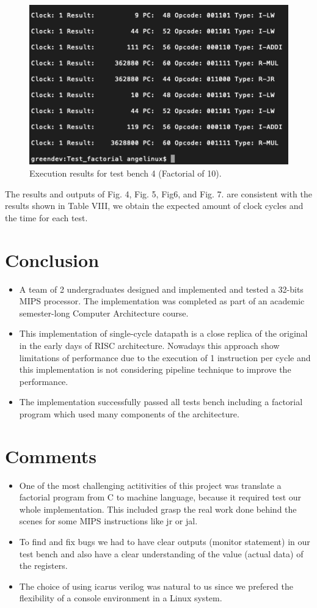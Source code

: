 \documentclass[conference]{IEEEtran}
\begin{document}
\begin{figure}[h]
\includegraphics[scale=0.5]{test_bench_4_factorial.png}
\caption{Execution results for test bench 4 (Factorial of 10).}
\label{result3}
\end{figure}

The results and outputs of Fig. 4, Fig. 5, Fig6, and Fig. 7. are consistent with the results shown in Table VIII, we obtain the expected amount of clock cycles and the time for each test.
 
\section{Conclusion}
\begin{itemize}
\item A team of 2 undergraduates designed and implemented and tested a 32-bits MIPS processor. The implementation was completed as part of an academic semester-long Computer Architecture course.
\item This implementation of single-cycle datapath is a close replica of the original in the early days of RISC architecture. Nowadays this approach show limitations of performance due to the execution of 1 instruction per cycle and this implementation is not considering pipeline technique to improve the performance.
\item The implementation successfully passed all tests bench including a factorial program which used many components of the architecture.
\end{itemize}
\section{Comments}
\begin{itemize}
\item One of the most challenging actitivities of this project was translate a factorial program from C to machine language, because it required test our whole implementation. This included grasp the real work done behind the scenes for some MIPS instructions like jr or jal.
\item To find and fix bugs we had to have clear outputs (monitor statement) in our test bench and also have a clear understanding of the value (actual data) of the registers.
\item The choice of using icarus verilog was natural to us since we prefered the flexibility of a console environment in a Linux system.
\end{itemize}
\end{document}
